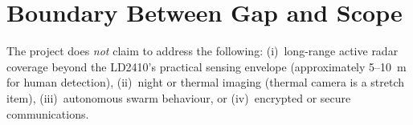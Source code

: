 \section{Boundary Between Gap and Scope}
The project does \emph{not} claim to address the following: (i)~long-range active radar coverage beyond the LD2410's practical sensing envelope (approximately 5--10~m for human detection), (ii)~night or thermal imaging (thermal camera is a stretch item), (iii)~autonomous swarm behaviour, or (iv)~encrypted or secure communications.
